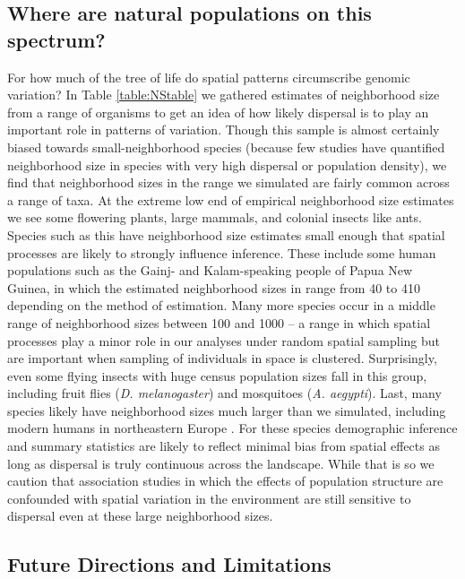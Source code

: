\documentclass[10pt,twoside,lineno,hidelinks]{preprint}
\begin{document}
\subsection{Where are natural populations on this spectrum?}
For how much of the tree of life do spatial patterns circumscribe genomic variation? In Table \ref{table:NStable} we gathered estimates of neighborhood size from a range of organisms to get an idea of how likely dispersal is to play an important role in patterns of variation. Though this sample is almost certainly biased towards small-neighborhood species (because few studies have quantified neighborhood size in species with very high dispersal or population density), we find that neighborhood sizes in the range we simulated are fairly common across a range of taxa. At the extreme low end of empirical neighborhood size estimates we see some flowering plants, large mammals, and colonial insects like ants. Species such as this have neighborhood size estimates small enough that spatial processes are likely to strongly influence inference. These include some human populations such as the Gainj- and Kalam-speaking people of Papua New Guinea, in which the estimated neighborhood sizes in \citep{Rousset1997} range from 40 to 410 depending on the method of estimation. Many more species occur in a middle range of neighborhood sizes between 100 and 1000 -- a range in which spatial processes play a minor role in our analyses under random spatial sampling but are important when sampling of individuals in space is clustered. Surprisingly, even some flying insects with huge census population sizes fall in this group, including fruit flies (\textit{D. melanogaster}) and mosquitoes (\textit{A. aegypti}). Last, many species likely have neighborhood sizes much larger than we simulated, including modern humans in northeastern Europe \citep{Ringbauer2017}. For these species demographic inference and summary statistics are likely to reflect minimal bias from spatial effects as long as dispersal is truly continuous across the landscape. While that is so we caution that association studies in which the effects of population structure are confounded with spatial variation in the environment are still sensitive to dispersal even at these large neighborhood sizes.


\subsection{Future Directions and Limitations}
\end{document}
